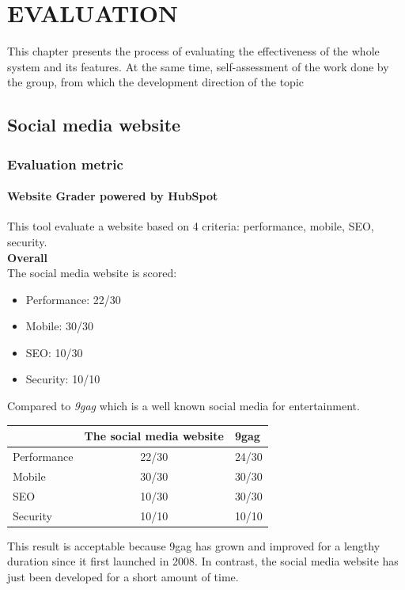 \chapter{EVALUATION}
This chapter presents the process of evaluating the effectiveness of the whole system and its features. At the same time, self-assessment of the work done by the group, from which the development direction of the topic
\section{Social media website}
\subsection{Evaluation metric}
\subsubsection{Website Grader powered by HubSpot}
This tool evaluate a website based on 4 criteria: performance, mobile, SEO, security.\\
\textbf{Overall}\\
The social media website is scored:
\begin{itemize}
\item Performance: 22/30
\item Mobile: 30/30
\item SEO: 10/30
\item Security: 10/10
\end{itemize}
Compared to \textit{9gag} which is a well known social media for entertainment. 
\begin{table}[H]
\begin{tabular}{|l|c|l|}
\hline
            & \multicolumn{1}{l|}{The social media website} & 9gag  \\ \hline
Performance & 22/30                                         & 24/30 \\ \hline
Mobile      & 30/30                                         & 30/30 \\ \hline
SEO         & 10/30                                         & 30/30 \\ \hline
Security    & 10/10                                         & 10/10 \\ \hline
\end{tabular}
\end{table}
This result is acceptable because 9gag has grown and improved for a lengthy duration since it first launched in 2008. In contrast, the social media website has just been developed for a short amount of time.\\
